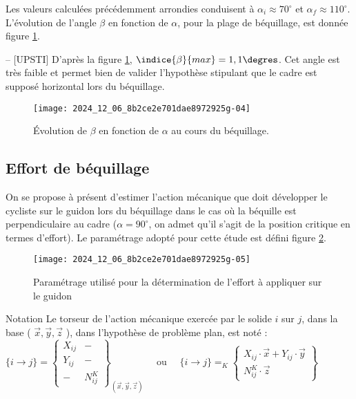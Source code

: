 Les valeurs calculées précédemment arrondies conduisent à \(\alpha_{i} \approx 70^{\circ}\) et \(\alpha_{f} \approx 110^{\circ}\). L'évolution de l'angle \(\beta\) en fonction de \(\alpha\), pour la plage de béquillage, est donnée figure \ref{fig_24}.

\ifprof
\begin{corrige}-- [UPSTI]
D’après la figure \ref{fig_24}, $\indice{\beta}{max}=1,1\degres$. Cet angle est très faible et permet bien de valider l’hypothèse stipulant que le cadre est supposé horizontal lors du béquillage.
\end{corrige}
\else
\fi

\begin{figure}[!htb]
\begin{center}
\texttt{[image: 2024\_12\_06\_8b2ce2e701dae8972925g-04]}
\caption{Évolution de \(\beta\) en fonction de \(\alpha\) au cours du béquillage. \label{fig_24}}
\end{center}
\end{figure}


\subsection{Effort de béquillage}
On se propose à présent d'estimer l'action mécanique que doit développer le cycliste sur le guidon lors du béquillage dans le cas où la béquille est perpendiculaire au cadre (\(\alpha=90^{\circ}\), on admet qu'il s'agit de la position critique en termes d'effort). Le paramétrage adopté pour cette étude est défini figure \ref{fig_25}.\\

\begin{figure}[!htb]
\begin{center}
\texttt{[image: 2024\_12\_06\_8b2ce2e701dae8972925g-05]}
\caption{Paramétrage utilisé pour la détermination de l'effort à appliquer sur le guidon \label{fig_25}}
\end{center}
\end{figure}


Notation Le torseur de l'action mécanique exercée par le solide \(i\) sur \(j\), dans la base ( \(\vec{x}, \vec{y}, \vec{z}\) ), dans l'hypothèse de problème plan, est noté :
$
\{i \rightarrow j\}=\left\{\begin{array}{c|c}
X_{i j} & - \\
Y_{i j} & - \\
- & N_{i j}^{K}
\end{array}\right\}_{(\vec{x}, \vec{y}, \vec{z})} \quad \text { ou } \quad\{i \rightarrow j\}=_{K}\left\{\begin{array}{c}
X_{i j} \cdot \vec{x}+Y_{i j} \cdot \vec{y} \\
N_{i j}^{K} \cdot \vec{z}
\end{array}\right\}
$

